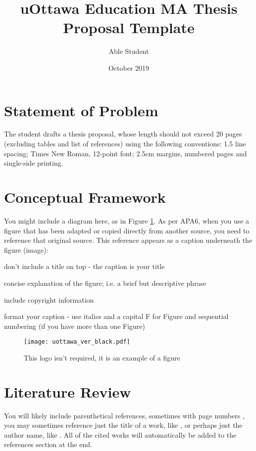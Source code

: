 \documentclass[
doc, 
biblatex,
12pt
]{apa6}
\title{uOttawa Education MA Thesis Proposal Template}
\author{Able Student}
\date{October 2019}
\affiliation{University of Ottawa}
\begin{document}
\maketitle

\section{Statement of Problem}
The student drafts a thesis proposal, whose length should not exceed 20 pages (excluding tables and list of references) using the following conventions: 1.5 line spacing; Times New Roman, 12-point font; 2.5cm margins, numbered pages and single-side printing.

\lipsum[1] %

\section{Conceptual Framework}
You might include a diagram here, as in Figure \ref{fig:logo}. As per APA6, when you use a figure that has been adapted or copied directly from another source, you need to reference that original source. This reference appears as a caption underneath the figure (image):

\begin{APAitemize}
\item don't include a title on top - the caption is your title
\item concise explanation of the figure; i.e. a brief but descriptive phrase
\item include copyright information
\item format your caption - use italics and a capital F for Figure and sequential numbering (if you have more than one Figure)
\end{APAitemize}

\begin{figure}[!ht]
\centering
\texttt{[image: uottawa\_ver\_black.pdf]}
\caption{This logo isn't required, it is an example of a figure}
\label{fig:logo}
\end{figure}

\section{Literature Review}
You will likely include parenthetical references, sometimes with page numbers \parencite[p.\,12-14]{writer2109Best}, you may sometimes reference just the title of a work, like , or perhaps just the author name, like  \citeauthor{writer2109Best}. All of the cited works will automatically be added to the references section at the end.
\end{document}
